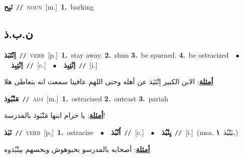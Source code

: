 \documentclass[10pt,a4paper,twoside]{article} %
\begin{document}
\begin{multicols}{2}
{\setlength\topsep{0pt}\textbf{\foreignlanguage{arabic}{نَبِح}}\ {\color{gray}\texttt{//}\color{black}}\ \textsc{noun}\ [m.]\ \textbf{1.}~barking\ } \vspace{2mm}

\vspace{-3mm}
\subsection*{\color{blue}\foreignlanguage{arabic}{ن.ب.ذ}\color{blue}{}} 

{\setlength\topsep{0pt}\textbf{\foreignlanguage{arabic}{اِنْتَبَذ}}\ {\color{gray}\texttt{//}\color{black}}\ \textsc{verb}\ [p.]\ \textbf{1.}~stay away.  \textbf{2.}~shun  \textbf{3.}~be spurned.  \textbf{4.}~be ostracized\ \ $\bullet$\ \ \setlength\topsep{0pt}\textbf{\foreignlanguage{arabic}{اِنْتِبِذ}}\ {\color{gray}\texttt{//}\color{black}}\ [c.]\ \ $\bullet$\ \ \setlength\topsep{0pt}\textbf{\foreignlanguage{arabic}{اِنْتِبِذ}}\ {\color{gray}\texttt{//}\color{black}}\ [i.]\  \begin{flushright}\color{gray}\foreignlanguage{arabic}{\textbf{\underline{\foreignlanguage{arabic}{أمثلة}}}: الابن الكبير اِنْتَبَذ عن أهله وحتى اللهم عافينا سمعت انه بتعاطى هلا}\end{flushright}\color{black}} \vspace{2mm}

{\setlength\topsep{0pt}\textbf{\foreignlanguage{arabic}{مَنْبُوذ}}\ {\color{gray}\texttt{//}\color{black}}\ \textsc{adj}\ [m.]\ \textbf{1.}~ostracized  \textbf{2.}~outcast  \textbf{3.}~pariah\  \begin{flushright}\color{gray}\foreignlanguage{arabic}{\textbf{\underline{\foreignlanguage{arabic}{أمثلة}}}: يا حرام ابنها مَنْبَوذ بالمدرسة!}\end{flushright}\color{black}} \vspace{2mm}

{\setlength\topsep{0pt}\textbf{\foreignlanguage{arabic}{نَبَذ}}\ {\color{gray}\texttt{//}\color{black}}\ \textsc{verb}\ [p.]\ \textbf{1.}~ostracize\ \ $\bullet$\ \ \setlength\topsep{0pt}\textbf{\foreignlanguage{arabic}{اُنْبُذ}}\ {\color{gray}\texttt{//}\color{black}}\ [c.]\ \ $\bullet$\ \ \setlength\topsep{0pt}\textbf{\foreignlanguage{arabic}{يِنْبُذ}}\ {\color{gray}\texttt{//}\color{black}}\ [i.]\ \color{gray}(msa. \foreignlanguage{arabic}{يَنْبُذ}~\foreignlanguage{arabic}{\textbf{١.}})\color{black}\  \begin{flushright}\color{gray}\foreignlanguage{arabic}{\textbf{\underline{\foreignlanguage{arabic}{أمثلة}}}: أصحابه بالمدرسو بحبوهوش وبحسهم بينْبُذوه}\end{flushright}\color{black}} \vspace{2mm}


\end{multicols}
\end{document}
